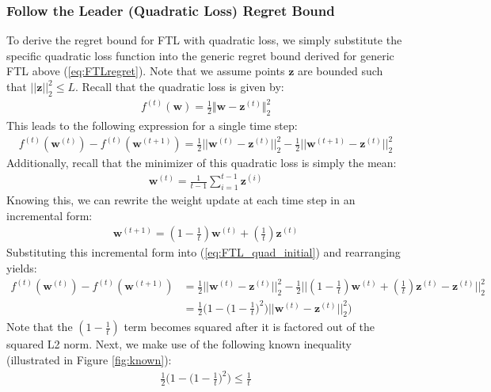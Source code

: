 \documentclass[11pt]{article}
\begin{document}
\subsubsection{Follow the Leader (Quadratic Loss) Regret Bound}
To derive the regret bound for FTL with quadratic loss, we simply substitute the specific quadratic loss function into the generic regret bound derived for generic FTL above (\ref{eq:FTLregret}). Note that we assume points $\boldsymbol{z}$ are bounded such that $||\boldsymbol{z}||^2_2 \leq L$. Recall that the quadratic loss is given by:
\begin{align}
    f^{(t)}(\boldsymbol{w})=\frac{1}{2}\Vert \boldsymbol{w}-\boldsymbol{z}^{(t)}\Vert^2_2
\end{align}
This leads to the following expression for a single time step:
\begin{align}
    f^{(t)}(\boldsymbol{w}^{(t)}) - f^{(t)}(\boldsymbol{w}^{(t+1)}) = \frac{1}{2}||\boldsymbol{w}^{(t)} - \boldsymbol{z}^{(t)}||_2^2 - \frac{1}{2}||\boldsymbol{w}^{(t+1)} - \boldsymbol{z}^{(t)}||_2^2
    \label{eq:FTL_quad_initial}
\end{align}
Additionally, recall that the minimizer of this quadratic loss is simply the mean:
\begin{align}
    \boldsymbol{w}^{(t)} = \frac{1}{t-1}\sum_{i=1}^{t-1} {\boldsymbol{z}}^{(i)}
    \label{eq:FTL_avg_z}
\end{align}
Knowing this, we can rewrite the weight update at each time step in an incremental form:
\begin{align}
    \boldsymbol{w}^{(t+1)} = (1-\frac{1}{t})\boldsymbol{w}^{(t)} + (\frac{1}{t})\boldsymbol{z}^{(t)}
\end{align}
Substituting this incremental form into (\ref{eq:FTL_quad_initial}) and rearranging yields:
\begin{align}
    f^{(t)}(\boldsymbol{w}^{(t)}) - f^{(t)}(\boldsymbol{w}^{(t+1)}) &= \frac{1}{2}||\boldsymbol{w}^{(t)} - \boldsymbol{z}^{(t)}||_2^2 - \frac{1}{2}||(1-\frac{1}{t})\boldsymbol{w}^{(t)} + (\frac{1}{t})\boldsymbol{z}^{(t)} - \boldsymbol{z}^{(t)}||_2^2\\
    &=\frac{1}{2} \Big( 1- \big( 1-\frac{1}{t} \big) ^2 \Big) ||\boldsymbol{w}^{(t)} - \boldsymbol{z}^{(t)}||_2^2
    \label{eq:FTL_quad_middle})
\end{align}
Note that the $(1-\frac{1}{t})$ term becomes squared after it is factored out of the squared L2 norm. Next, we make use of the following known inequality (illustrated in Figure \ref{fig:known}):
\begin{align}
    \frac{1}{2} \Big( 1- \big( 1-\frac{1}{t} \big) ^2 \Big) \leq \frac{1}{t}
    \label{eq:known}
\end{align}
\end{document}
